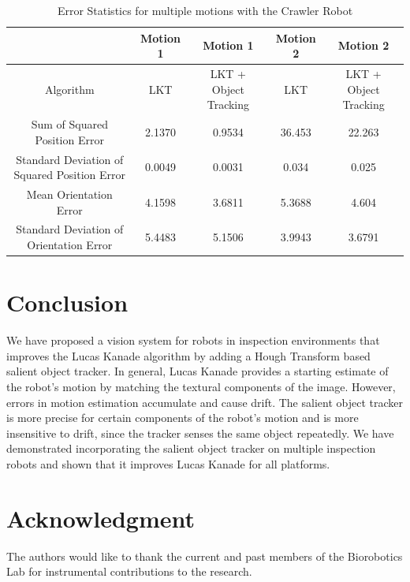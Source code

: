 \documentclass[letterpaper, 10 pt, conference]{ieeeconf}
\begin{document}
\begin{table}[tb]
	\centering
	\footnotesize
	\setlength{\tabcolsep}{.6em}
	\caption{Error Statistics for multiple motions with the Crawler Robot}
	\label{table:crawler_results}
	\begin{tabular}{c|c|c|c|c|}
	\hline
	& Motion 1 & Motion 1 & Motion 2 & Motion 2\\
	\hline
	Algorithm & LKT & LKT + Object Tracking & LKT & LKT + Object Tracking\\ 
	\hline
	Sum of Squared Position Error & 2.1370 & 0.9534 & 36.453 & 22.263\\
	\hline
	Standard Deviation of Squared Position Error & 0.0049 & 0.0031 & 0.034 & 0.025\\
	\hline
	Mean Orientation Error & 4.1598 & 3.6811 & 5.3688 & 4.604\\
	\hline
	Standard Deviation of Orientation Error & 5.4483 & 5.1506 & 3.9943 & 3.6791\\
	\hline
	\end{tabular}
\end{table}

\section{Conclusion}

We have proposed a vision system for robots in inspection environments that improves the Lucas Kanade algorithm by adding a Hough Transform based salient object tracker. In general, Lucas Kanade provides a starting estimate of the robot's motion by matching the textural components of the image. However, errors in motion estimation accumulate and cause drift. The salient object tracker is more precise for certain components of the robot's motion and is more insensitive to drift, since the tracker senses the same object repeatedly. We have demonstrated incorporating the salient object tracker on multiple inspection robots and shown that it improves Lucas Kanade for all platforms.



\addtolength{\textheight}{-1cm}

\section*{Acknowledgment}

The authors would like to thank the current and past members of the Biorobotics Lab for instrumental contributions to the research.



\end{document}

